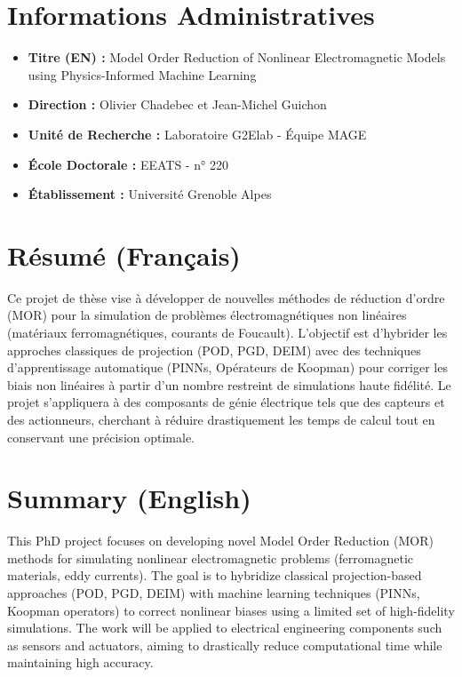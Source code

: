 \documentclass[a4paper,11pt]{article}
\begin{document}
\section*{Informations Administratives}
\begin{itemize}[label=--]
    \item \textbf{Titre (EN) :} Model Order Reduction of Nonlinear Electromagnetic Models using Physics-Informed Machine Learning
    \item \textbf{Direction :} Olivier Chadebec et Jean-Michel Guichon
    \item \textbf{Unité de Recherche :} Laboratoire G2Elab - Équipe MAGE
    \item \textbf{École Doctorale :} EEATS - n° 220
    \item \textbf{Établissement :} Université Grenoble Alpes
\end{itemize}

\section*{Résumé (Français)}
Ce projet de thèse vise à développer de nouvelles méthodes de réduction d’ordre (MOR) pour la simulation de problèmes électromagnétiques non linéaires (matériaux ferromagnétiques, courants de Foucault). L’objectif est d’hybrider les approches classiques de projection (POD, PGD, DEIM) avec des techniques d’apprentissage automatique (PINNs, Opérateurs de Koopman) pour corriger les biais non linéaires à partir d'un nombre restreint de simulations haute fidélité. Le projet s’appliquera à des composants de génie électrique tels que des capteurs et des actionneurs, cherchant à réduire drastiquement les temps de calcul tout en conservant une précision optimale.

\section*{Summary (English)}
This PhD project focuses on developing novel Model Order Reduction (MOR) methods for simulating nonlinear electromagnetic problems (ferromagnetic materials, eddy currents). The goal is to hybridize classical projection-based approaches (POD, PGD, DEIM) with machine learning techniques (PINNs, Koopman operators) to correct nonlinear biases using a limited set of high-fidelity simulations. The work will be applied to electrical engineering components such as sensors and actuators, aiming to drastically reduce computational time while maintaining high accuracy.
\end{document}
